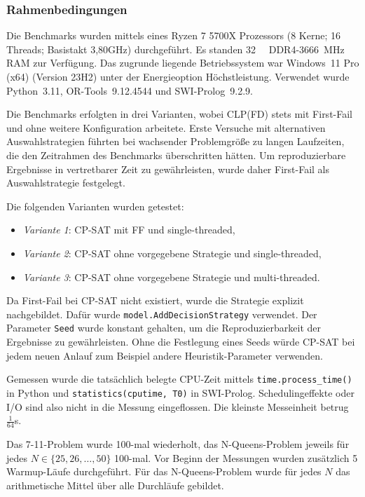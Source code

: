 \documentclass[12pt,a4paper]{article}
\begin{document}
\subsubsection{Rahmenbedingungen}
Die Benchmarks wurden mittels eines Ryzen 7 5700X Prozessors (8 Kerne; 16 Threads; Basistakt 3,80GHz) durchgeführt.
Es standen \SI{32}{\giga\byte} DDR4-\SI{3666}{\mega\hertz} RAM zur Verfügung.
Das zugrunde liegende Betriebssystem war Windows~11 Pro (x64) (Version 23H2) unter der Energieoption \glqq Höchstleistung\grqq.
Verwendet wurde Python~3.11, OR-Tools~9.12.4544 und SWI-Prolog~9.2.9.

Die Benchmarks erfolgten in drei Varianten, wobei CLP(FD) stets mit First-Fail und ohne weitere Konfiguration arbeitete. 
Erste Versuche mit alternativen Auswahlstrategien führten bei wachsender Problemgröße zu langen Laufzeiten, die den Zeitrahmen des Benchmarks überschritten hätten.
Um reproduzierbare Ergebnisse in vertretbarer Zeit zu gewährleisten, wurde daher First-Fail als Auswahlstrategie festgelegt.

\noindent
Die folgenden Varianten wurden getestet:
\begin{itemize}
    \item \emph{Variante 1}: CP-SAT mit FF und single-threaded,
    \item \emph{Variante 2}: CP-SAT ohne vorgegebene Strategie und single-threaded,
    \item \emph{Variante 3}: CP-SAT ohne vorgegebene Strategie und multi-threaded.
\end{itemize}
\noindent
Da First-Fail bei CP-SAT nicht existiert, wurde die Strategie explizit nachgebildet.
Dafür wurde \verb|model.AddDecisionStrategy| verwendet.
Der Parameter \texttt{Seed} wurde konstant gehalten, um die Reproduzierbarkeit der Ergebnisse zu gewährleisten.
Ohne die Festlegung eines Seeds würde CP-SAT bei jedem neuen Anlauf zum Beispiel andere Heuristik-Parameter verwenden.

Gemessen wurde die tatsächlich belegte CPU-Zeit mittels \verb|time.process_time()| in Python und \verb|statistics(cputime, T0)| in SWI-Prolog.
Schedulingeffekte oder I/O sind also nicht in die Messung eingeflossen.
Die kleinste Messeinheit betrug $\frac{1}{64}$s.

Das 7-11-Problem wurde 100-mal wiederholt, das N-Queens-Problem jeweils für jedes $N \in \{25,26,\dots,50\}$ 100-mal.
Vor Beginn der Messungen wurden zusätzlich 5 Warmup-Läufe durchgeführt.
Für das N-Queens-Problem wurde für jedes $N$ das arithmetische Mittel über alle Durchläufe gebildet.
\end{document}

